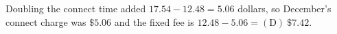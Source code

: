 Doubling the connect time added $17.54-12.48=5.06$ dollars, so December's connect charge was $\$5.06$ and the fixed fee is $12.48-5.06=\boxed{\mathrm{(D)}\ \$7.42}$.
